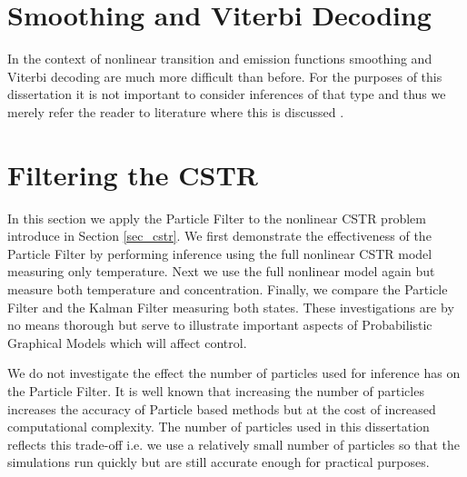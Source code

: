\section{Smoothing and Viterbi Decoding}
In the context of nonlinear transition and emission functions smoothing and Viterbi decoding are much more difficult than before. For the purposes of this dissertation it is not important to consider inferences of that type and thus we merely refer the reader to literature where this is discussed \cite{barber}\cite{pftut}\cite{gsf1}\cite{murphy1}\cite{murphy2}.

\section{Filtering the CSTR}
\label{sec_nonlinmods_filtering}
In this section we apply the Particle Filter to the nonlinear CSTR problem introduce in Section \ref{sec_cstr}. We first demonstrate the effectiveness of the Particle Filter by performing inference using the full nonlinear CSTR model measuring only temperature. Next we use the full nonlinear model again but measure both temperature and concentration. Finally, we compare the Particle Filter and the Kalman Filter measuring both states. These investigations are by no means thorough but serve to illustrate important aspects of Probabilistic Graphical Models which will affect control.

We do not investigate the effect the number of particles used for inference has on the Particle Filter. It is well known that increasing the number of particles increases the accuracy of Particle based methods \cite{murphy1} but at the cost of increased computational complexity. The number of particles used in this dissertation reflects this trade-off i.e. we use a relatively small number of particles so that the simulations run quickly but are still accurate enough for practical purposes. 

